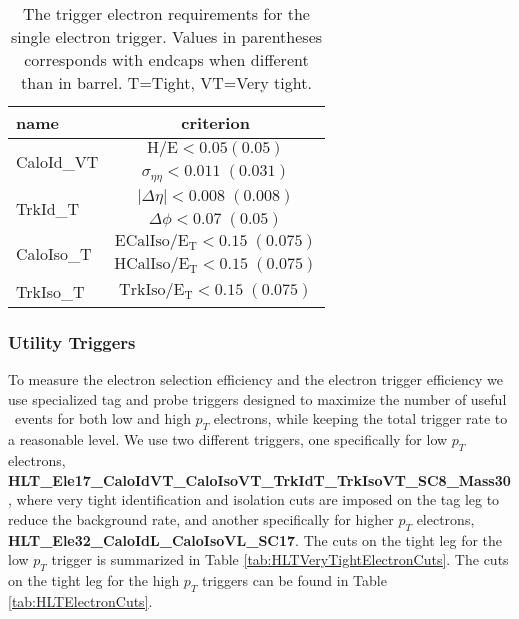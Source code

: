 \begin{table}[htb]
 \caption{The trigger electron requirements for the single electron trigger. 
Values in parentheses corresponds with endcaps when different than in 
barrel. T=Tight, VT=Very tight.}
 \label{tab:HLTTightElectronCuts}
 \centering
 \begin{tabular}{|l||c|}
   \hline
   name                       &  criterion \\
   \hline \hline
   \multirow{2}{*}{CaloId\_VT} & $\mathrm{H/E < 0.05 (0.05) }$ \\
                               & $\sigma_{\eta\eta}\mathrm{< 0.011\;(0.031)}$ \\
    \hline
    \multirow{2}{*}{TrkId\_T} & $|\Delta\eta|\mathrm{< 0.008\; (0.008)}$ \\
                               & $\Delta\phi\mathrm{< 0.07\;(0.05)}$  \\
    \hline
    \multirow{2}{*}{CaloIso\_T} & $\mathrm{ECalIso/E_T <0.15\;(0.075)}$ \\
                                 & $\mathrm{HCalIso/E_T <0.15\;(0.075)}$ \\    
    \hline
    TrkIso\_T                   & $\mathrm{TrkIso/E_T <0.15\;(0.075)}$ \\

   \hline
 \end{tabular}
\end{table}


\subsubsection{Utility Triggers}
\label{sec:utilityTriggers}

To measure the electron selection efficiency and the electron trigger
efficiency we use specialized tag and probe triggers designed to maximize
the number of useful \dyll~events for both low and high $p_{T}$ electrons,
while keeping the total trigger rate to a reasonable level. We use 
two different triggers, one specifically for low $p_{T}$ electrons,
{\bf HLT\_Ele17\_CaloIdVT\_CaloIsoVT\_TrkIdT\_TrkIsoVT\_SC8\_Mass30}, 
where very tight identification and isolation cuts are imposed on the 
tag leg to reduce the background rate, and another specifically for
higher $p_{T}$ electrons, {\bf HLT\_Ele32\_CaloIdL\_CaloIsoVL\_SC17}.
The cuts on the tight leg for the low $p_{T}$ trigger is summarized in 
Table \ref{tab:HLTVeryTightElectronCuts}. The cuts on the tight leg
for the high $p_{T}$ triggers can be found in 
Table \ref{tab:HLTElectronCuts}. 

